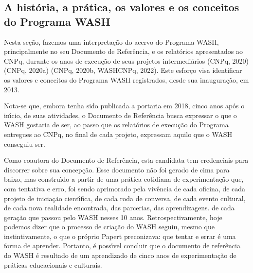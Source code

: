 \documentclass[
12pt,		%
openright,	%
twoside,  %
a4paper,			%
chapter=TITLE,		%
english,			%
french,				%
spanish,			%
brazil				%
]{USPSC-classe/USPSC}
\begin{document}
\subsection[A hist\'oria, a pr\'atica, os valores e os conceitos do Programa WASH]{A hist\'oria, a pr\'atica, os valores e os conceitos do Programa WASH}\label{A hist\'oria, a pr\'atica, os valores e os conceitos do Programa WASH}
Nesta se\c{c}\~ao, fazemos uma interpreta\c{c}\~ao do acervo do Programa WASH, principalmente no seu Documento de Refer\^encia, e os relat\'orios apresentados ao CNPq, durante os anos de execu\c{c}\~ao de seus projetos intermedi\'arios (CNPq, 2020)  (CNPq, 2020a) (CNPq, 2020b, WASHCNPq, 2022). Este esfor\c{c}o visa identificar os valores e conceitos do Programa WASH registrados, desde sua inaugura\c{c}\~ao, em 2013.

















Nota-se que, embora tenha sido publicada a portaria em 2018, cinco anos ap\'os o in\'{\i}cio, de suas atividades, o Documento de Refer\^encia busca expressar \textquotedbl o que o WASH gostaria de ser\textquotedbl , ao passo que os relat\'orios de execu\c{c}\~ao do Programa entregues ao CNPq, no final de cada projeto, expressam \textquotedbl aquilo que o WASH conseguiu ser\textquotedbl .

















Como coautora do Documento de Refer\^encia, esta candidata tem credenciais para discorrer sobre sua concep\c{c}\~ao. Esse documento n\~ao foi gerado de cima para baixo, mas constru\'{\i}do a partir de uma pr\'atica cotidiana de experimenta\c{c}\~ao que, com  \textquotedbl tentativa e erro\textquotedbl , foi sendo aprimorado pela viv\^encia de cada oficina, de cada projeto de inicia\c{c}\~ao cient\'{\i}fica, de cada roda de conversa, de cada  evento cultural, de cada nova realidade encontrada, das parcerias, das aprendizagens. de cada gera\c{c}\~ao que passou pelo WASH nesses 10 anos. Retrospectivamente, hoje podemos dizer que o processo de cria\c{c}\~ao do WASH seguiu, mesmo que instintivamente, o que o pr\'oprio Papert preconizava: que tentar e errar \'e uma forma de aprender. Portanto, \'e poss\'{\i}vel concluir que o documento de refer\^encia do WASH \'e resultado de um aprendizado de cinco anos de experimenta\c{c}\~ao de pr\'aticas educacionais e culturais.
\end{document}
